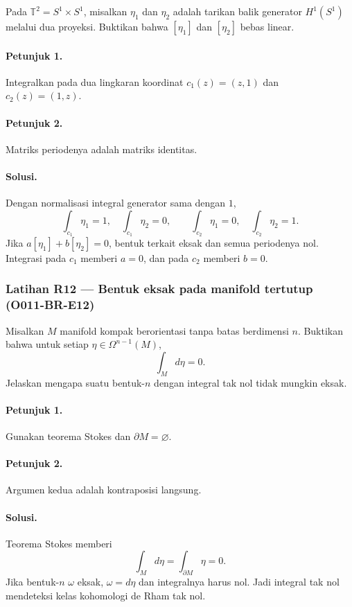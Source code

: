 Pada $\mathbb T^2=S^1\times S^1$, misalkan $\eta_1$ dan $\eta_2$ adalah
tarikan balik generator $H^1(S^1)$ melalui dua proyeksi. Buktikan bahwa
$[\eta_1]$ dan $[\eta_2]$ bebas linear.

\paragraph{Petunjuk 1.}
Integralkan pada dua lingkaran koordinat
$c_1(z)=(z,1)$ dan $c_2(z)=(1,z)$.

\paragraph{Petunjuk 2.}
Matriks periodenya adalah matriks identitas.

\paragraph{Solusi.}
Dengan normalisasi integral generator sama dengan $1$,
\[
 \int_{c_1}\eta_1=1,\quad \int_{c_1}\eta_2=0,
 \qquad
 \int_{c_2}\eta_1=0,\quad \int_{c_2}\eta_2=1.
\]
Jika $a[\eta_1]+b[\eta_2]=0$, bentuk terkait eksak dan semua periodenya nol.
Integrasi pada $c_1$ memberi $a=0$, dan pada $c_2$ memberi $b=0$.

\subsubsection*{Latihan R12 — Bentuk eksak pada manifold tertutup (O011-BR-E12)}
\label{o011-br-e12}

Misalkan $M$ manifold kompak berorientasi tanpa batas berdimensi $n$. Buktikan
bahwa untuk setiap $\eta\in\Omega^{n-1}(M)$,
\[
 \int_M d\eta=0.
\]
Jelaskan mengapa suatu bentuk-$n$ dengan integral tak nol tidak mungkin eksak.

\paragraph{Petunjuk 1.}
Gunakan teorema Stokes dan $\partial M=\varnothing$.

\paragraph{Petunjuk 2.}
Argumen kedua adalah kontraposisi langsung.

\paragraph{Solusi.}
Teorema Stokes memberi
\[
 \int_Md\eta=\int_{\partial M}\eta=0.
\]
Jika bentuk-$n$ $\omega$ eksak, $\omega=d\eta$ dan integralnya harus nol.
Jadi integral tak nol mendeteksi kelas kohomologi de Rham tak nol.

